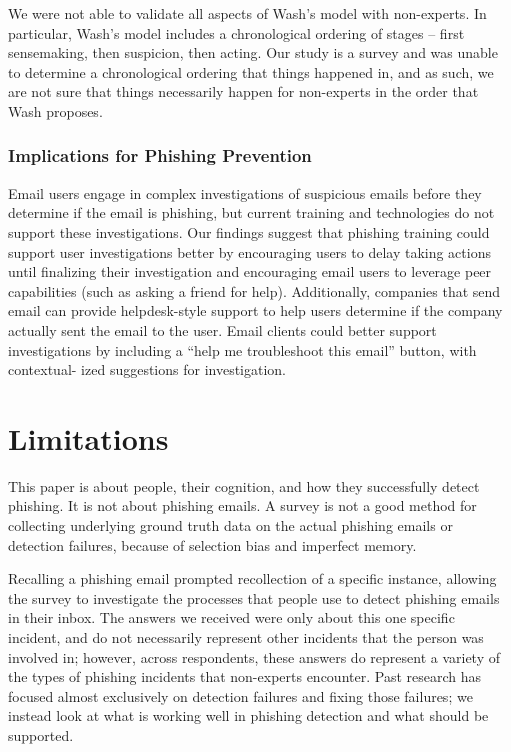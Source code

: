 \documentclass[lettersize,journal]{IEEEtran}
\begin{document}
We were not able to validate all aspects of Wash’s model with non-experts. In
particular, Wash’s model includes a chronological ordering of stages – first
sensemaking, then suspicion, then acting. Our study is a survey and was unable
to determine a chronological ordering that things happened in, and as such, we
are not sure that things necessarily happen for non-experts in the order that
Wash proposes.

\subsubsection{Implications for Phishing Prevention}

Email users engage in complex investigations of suspicious emails before they
determine if the email is phishing, but current training and technologies do
not support these investigations. Our findings suggest that phishing training
could support user investigations better by encouraging users to delay taking
actions until finalizing their investigation and encouraging email users to
leverage peer capabilities (such as asking a friend for help). Additionally,
companies that send email can provide helpdesk-style support to help users
determine if the company actually sent the email to the user. Email clients
could better support investigations by including a “help me troubleshoot this
email” button, with contextual- ized suggestions for investigation.

\section{Limitations}

This paper is about people, their cognition, and how they successfully detect
phishing. It is not about phishing emails. A survey is not a good method for
collecting underlying ground truth data on the actual phishing emails or
detection failures, because of selection bias and imperfect memory.

Recalling a phishing email prompted recollection of a specific instance,
allowing the survey to investigate the processes that people use to detect
phishing emails in their inbox. The answers we received were only about this
one specific incident, and do not necessarily represent other incidents that
the person was involved in; however, across respondents, these answers do
represent a variety of the types of phishing incidents that non-experts
encounter. Past research has focused almost exclusively on detection failures
and fixing those failures; we instead look at what is working well in phishing
detection and what should be supported.
\end{document}
